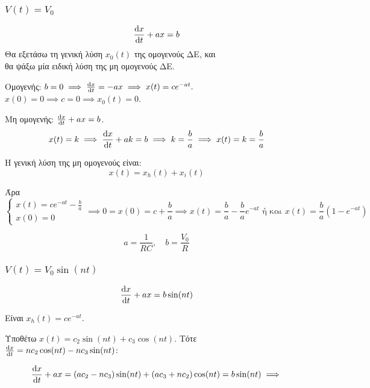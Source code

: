 \documentclass[11pt,a4paper,titlepage,draft]{article}
\begin{document}
\subsubsection{\(V(t) = V_0\)}
\[
\frac{\dif x}{\dif t}+ax=b
\]
Θα εξετάσω τη γενική λύση \(x_0(t)\) της ομογενούς ΔΕ, και \\
θα ψάξω μία ειδική λύση της μη ομογενούς ΔΕ.

Ομογενής: \(b=0 \implies \frac{\dif x}{\dif t} = -ax \implies x(t)=ce^{-at}.\)\\\(x(0)=0\implies c=0 \implies x_0(t)=0\).

Μη ομογενής: \(\frac{\dif x}{\dif t}+ax=b\).
\[
x(t)=k \implies \frac{\dif x}{\dif t}+ak=b \implies k =\frac{b}{a} \implies x(t)=k=\frac{b}{a}
\]

\begin{theorem*}{}
Η γενική λύση της μη ομογενούς είναι:
\[x(t) = x_h(t)+x_i(t) \]
\end{theorem*}

Άρα \[
\begin{cases}
x(t) = ce^{-at} - \frac{b}{a} \\
x(0) = 0
\end{cases}
\implies 0=x(0)=c+\frac{b}{a}
\implies x(t) =\frac{b}{a}-\frac{b}{a}e^{-at} \text{ ή και }
 x(t) =\frac{b}{a}(1-e^{-at})
 \]


 
\[
a=\frac{1}{RC}, \quad b= \frac{V_0}{R}
\]

\subsubsection{\(V(t)=V_0 \sin(nt)\)}
\[
\frac{\dif x}{\dif t} + ax = b\sin (nt)
\]

Είναι \(x_h(t) = ce^{-at}\).

Υποθέτω \(x(t) = c_2 \sin (nt) + c_3 \cos (nt) \). Τότε \( \frac{\dif x}{\dif t} = nc_2 \cos (nt) - nc_3 \sin (nt) \):

\[ \frac{\dif x}{\dif t} +ax =
\left( ac_2 - nc_3
\right)
\sin (nt) +
\left( ac_3 + nc_2
\right) \cos (nt)
= b \sin (nt) \implies
\]
\end{document}
